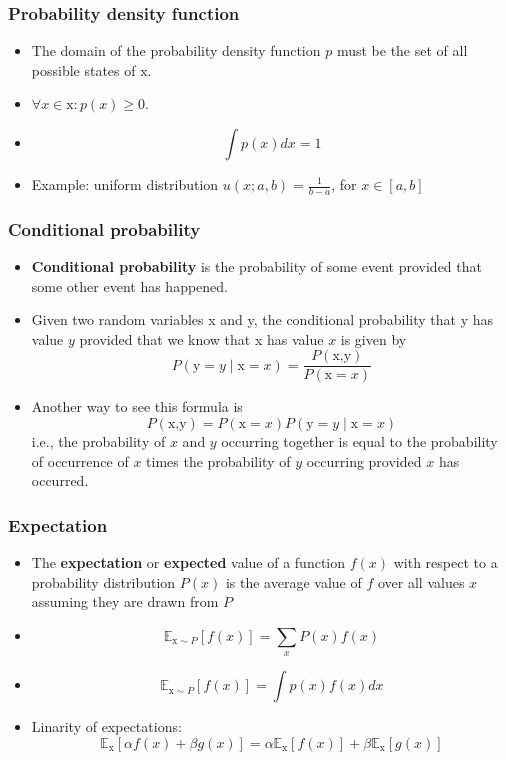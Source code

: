 \documentclass[notes]{beamer}          %
\newcommand{\field}[1]{\mathbb{#1}}
\begin{document}
\begin{frame}
\frametitle{Probability density function}
\begin{itemize}
    \item The domain of the probability density function $p$ must be the set of all possible states of $\text{x}$.
    \item $\forall x \in \text{x}: p(x)\geq 0.$
    \item $$\int p(x)dx = 1$$
    \item Example: uniform distribution $u(x;a,b) = \frac{1}{b-a}$, for $x \in [a,b]$
\end{itemize}

\end{frame}


\begin{frame}
\frametitle{Conditional probability}
    \begin{itemize}
        \item {\bf Conditional probability} is the probability of some event provided that some other event has happened.
        \item
        Given two random variables x and y, the conditional probability that y has value $y$ provided that we know that x has value $x$ is given by
        $$
        P(\text{y}=y \mid \text{x} = x) = \frac{P(\text{x,y})}{P(\text{x}=x)}
        $$
        \item Another way to see this formula is $$P(\text{x,y}) = P(\text{x} = x)P(\text{y} = y \mid \text{x} = x)$$ i.e., the probability of $x$ and $y$ occurring together is equal to the probability of occurrence of $x$ times the probability of $y$ occurring provided $x$ has occurred.
    \end{itemize}

\end{frame}





\begin{frame}
\frametitle{Expectation}
\begin{itemize}
    \item The {\bf expectation} or {\bf expected} value of a function $f(x)$ with respect to a probability distribution $P(x)$ is the average value of $f$ over all values $x$ assuming they are drawn from $P$
    \item $$\field{E}_{\text{x} \sim P} [f(x)] = \sum_{x} P(x) f(x)$$
    \item $$\field{E}_{\text{x} \sim P} [f(x)] = \int p(x) f(x) dx$$
    \item Linarity of expectations:
    $$\field{E}_{\text{x}} [\alpha f(x) + \beta g(x)] =  \alpha \field{E}_\text{x}[f(x)] + \beta \field{E}_\text{x}[g(x)]$$
\end{itemize}

\end{frame}
\end{document}
